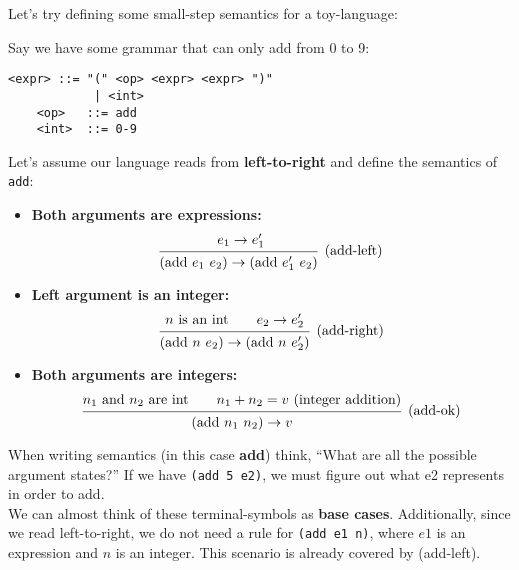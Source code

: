 \newpage

\noindent
Let's try defining some small-step semantics for a toy-language:
\begin{Example}
    
    \label{ex:small-step-semantics}
    Say we have some grammar that can only add from 0 to 9:
    \begin{lstlisting}[numbers=none]
    <expr> ::= "(" <op> <expr> <expr> ")"
            | <int>
    <op>   ::= add
    <int>  ::= 0-9
    \end{lstlisting}

    \noindent
    Let's assume our language reads from \textbf{left-to-right} and define the semantics of \texttt{add}:
    \begin{itemize}
        \item \textbf{Both arguments are expressions:}
        \[
        \begin{prooftree}
        \hypo{\ e_1 \rightarrow e_1'}
        \Infer1[\text{(add-left)}]{ (\text{add}\ e_1\ e_2) \rightarrow (\text{add}\ e_1'\ e_2) }
        \end{prooftree}
        \]
        \item \textbf{Left argument is an integer:}
        \[
        \begin{prooftree}
        \hypo{n \text{ is an int}\qquad e_2 \rightarrow e_2'}
        \Infer1[\text{(add-right)}]{ (\text{add}\ n\ e_2) \rightarrow (\text{add}\ n\ e_2') }
        \end{prooftree}
        \]
        \item \textbf{Both arguments are integers:}
        \[
        \begin{prooftree}
        \hypo{n_1 \text{ and } n_2 \text{ are int} \qquad n_1 + n_2 = v \text{ (integer addition)}}
        \Infer1[\text{(add-ok)}]{ (\text{add}\ n_1\ n_2) \rightarrow v }
        \end{prooftree}
        \]
    \end{itemize}

    \noindent
    When writing semantics (in this case \textbf{add}) think, ``What are all the possible argument states?''
    If we have \texttt{(add 5 e2)}, we must figure out what e2 represents in order to add.\\

    \noindent
    We can almost think of these terminal-symbols as \textbf{base cases}.
    Additionally, since we read left-to-right, we do not need a rule for \texttt{(add e1 n)}, where $e1$ is an expression and $n$ is an integer.
    This scenario is already covered by (add-left).

\end{Example}
        
